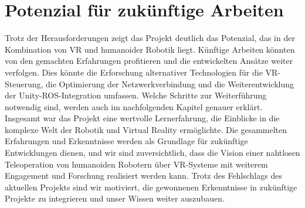\section{Potenzial für zukünftige Arbeiten}
Trotz der Herausforderungen zeigt das Projekt deutlich das Potenzial, das in der Kombination von VR und humanoider Robotik liegt. Künftige Arbeiten könnten von den gemachten Erfahrungen profitieren und die entwickelten Ansätze weiter verfolgen. Dies könnte die Erforschung alternativer Technologien für die VR-Steuerung, die Optimierung der Netzwerkverbindung und die Weiterentwicklung der Unity-ROS-Integration umfassen. Welche Schritte zur Weiterführung notwendig sind, werden auch im nachfolgenden Kapitel genauer erklärt.
\\

\noindent
Insgesamt war das Projekt eine wertvolle Lernerfahrung, die Einblicke in die komplexe Welt der Robotik und Virtual Reality ermöglichte. Die gesammelten Erfahrungen und Erkenntnisse werden als Grundlage für zukünftige Entwicklungen dienen, und wir sind zuversichtlich, dass die Vision einer nahtlosen Teleoperation von humanoiden Robotern über VR-Systeme mit weiterem Engagement und Forschung realisiert werden kann. Trotz des Fehlschlags des aktuellen Projekts sind wir motiviert, die gewonnenen Erkenntnisse in zukünftige Projekte zu integrieren und unser Wissen weiter auszubauen.
